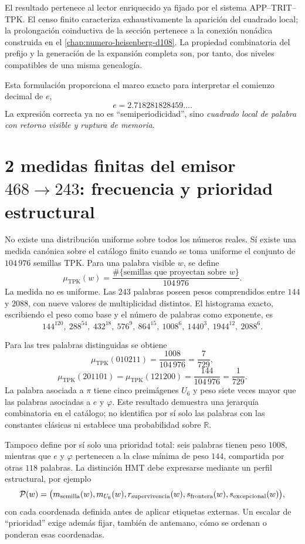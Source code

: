 El resultado pertenece al lector enriquecido ya fijado por el sistema
APP--TRIT--TPK\@. El censo finito caracteriza exhaustivamente la aparición del
cuadrado local; la prolongación coinductiva de la sección pertenece a la
conexión nonádica construida en el
\cref{chap:numero-heisenberg-d108}. La propiedad combinatoria del prefijo y
la generación de la expansión completa son, por tanto, dos niveles
compatibles de una misma genealogía.

Esta formulación proporciona el marco exacto para interpretar el comienzo
decimal de \(e\),
\[
e=2.718281828459\ldots.
\]
La expresión correcta ya no es ``semiperiodicidad'', sino \emph{cuadrado local
de palabra con retorno visible y ruptura de memoria}.

\section{2 medidas finitas del emisor \(468\to243\): frecuencia y prioridad estructural}

No existe una distribución uniforme sobre todos los números reales. Sí
existe una medida canónica sobre el catálogo finito cuando se toma uniforme
el conjunto de \(104\,976\) semillas TPK\@. Para una palabra visible \(w\), se
define
\[
\mu_{\mathrm{TPK}}(w)
=\frac{\#\{\text{semillas que proyectan sobre }w\}}{104\,976}.
\]
La medida no es uniforme. Las \(243\) palabras poseen pesos comprendidos
entre \(144\) y \(2088\), con nueve valores de multiplicidad distintos.
El histograma exacto, escribiendo el peso como base y el número de palabras
como exponente, es
\[
144^{120},\ 288^{54},\ 432^{18},\ 576^9,\ 864^{15},\
1008^6,\ 1440^3,\ 1944^{12},\ 2088^6.
\]

Para las tres palabras distinguidas se obtiene
\[
\mu_{\mathrm{TPK}}(010211)=\frac{1008}{104\,976}=\frac7{729},
\]
\[
\mu_{\mathrm{TPK}}(201101)
=\mu_{\mathrm{TPK}}(121200)
=\frac{144}{104\,976}=\frac1{729}.
\]
La palabra asociada a \(\pi\) tiene cinco preimágenes \(U_6\) y peso siete
veces mayor que las palabras asociadas a \(e\) y \(\varphi\). Este resultado
demuestra una jerarquía combinatoria en el catálogo; no identifica por sí
solo las palabras con las constantes clásicas ni establece una probabilidad
sobre \(\mathbb R\).

Tampoco define por sí solo una prioridad total: seis palabras tienen peso
\(1008\), mientras que \(e\) y \(\varphi\) pertenecen a la clase mínima de
peso \(144\), compartida por otras \(118\) palabras. La distinción HMT debe
expresarse mediante un perfil estructural, por ejemplo
\[
\mathcal P(w)=
\bigl(m_{\rm semilla}(w),m_{U_6}(w),r_{\rm supervivencia}(w),
s_{\rm frontera}(w),s_{\rm excepcional}(w)\bigr),
\]
con cada coordenada definida antes de aplicar etiquetas externas. Un escalar
de ``prioridad'' exige además fijar, también de antemano, cómo se ordenan o
ponderan esas coordenadas.
\fi

